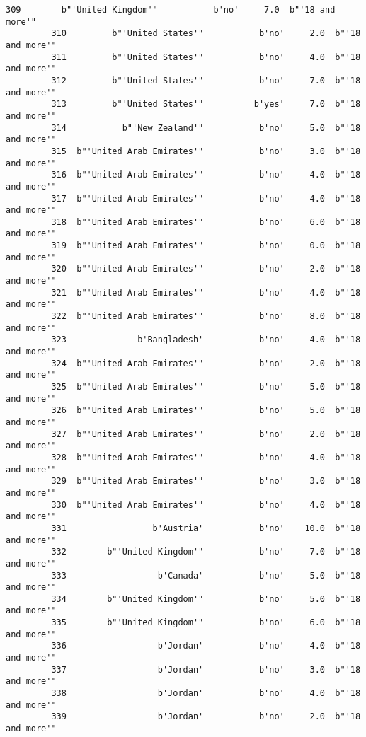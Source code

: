 \documentclass[11pt]{article}
\begin{document}
\begin{Verbatim}[commandchars=\\\{\}]
         309        b"'United Kingdom'"           b'no'     7.0  b"'18 and more'"   
         310         b"'United States'"           b'no'     2.0  b"'18 and more'"   
         311         b"'United States'"           b'no'     4.0  b"'18 and more'"   
         312         b"'United States'"           b'no'     7.0  b"'18 and more'"   
         313         b"'United States'"          b'yes'     7.0  b"'18 and more'"   
         314           b"'New Zealand'"           b'no'     5.0  b"'18 and more'"   
         315  b"'United Arab Emirates'"           b'no'     3.0  b"'18 and more'"   
         316  b"'United Arab Emirates'"           b'no'     4.0  b"'18 and more'"   
         317  b"'United Arab Emirates'"           b'no'     4.0  b"'18 and more'"   
         318  b"'United Arab Emirates'"           b'no'     6.0  b"'18 and more'"   
         319  b"'United Arab Emirates'"           b'no'     0.0  b"'18 and more'"   
         320  b"'United Arab Emirates'"           b'no'     2.0  b"'18 and more'"   
         321  b"'United Arab Emirates'"           b'no'     4.0  b"'18 and more'"   
         322  b"'United Arab Emirates'"           b'no'     8.0  b"'18 and more'"   
         323              b'Bangladesh'           b'no'     4.0  b"'18 and more'"   
         324  b"'United Arab Emirates'"           b'no'     2.0  b"'18 and more'"   
         325  b"'United Arab Emirates'"           b'no'     5.0  b"'18 and more'"   
         326  b"'United Arab Emirates'"           b'no'     5.0  b"'18 and more'"   
         327  b"'United Arab Emirates'"           b'no'     2.0  b"'18 and more'"   
         328  b"'United Arab Emirates'"           b'no'     4.0  b"'18 and more'"   
         329  b"'United Arab Emirates'"           b'no'     3.0  b"'18 and more'"   
         330  b"'United Arab Emirates'"           b'no'     4.0  b"'18 and more'"   
         331                 b'Austria'           b'no'    10.0  b"'18 and more'"   
         332        b"'United Kingdom'"           b'no'     7.0  b"'18 and more'"   
         333                  b'Canada'           b'no'     5.0  b"'18 and more'"   
         334        b"'United Kingdom'"           b'no'     5.0  b"'18 and more'"   
         335        b"'United Kingdom'"           b'no'     6.0  b"'18 and more'"   
         336                  b'Jordan'           b'no'     4.0  b"'18 and more'"   
         337                  b'Jordan'           b'no'     3.0  b"'18 and more'"   
         338                  b'Jordan'           b'no'     4.0  b"'18 and more'"   
         339                  b'Jordan'           b'no'     2.0  b"'18 and more'"   

\end{Verbatim}
\end{document}
